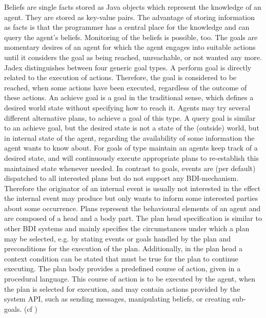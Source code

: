 Beliefs are single facts stored as Java objects which represent the knowledge of an agent. They are stored as key-value pairs. The advantage of storing information as facts is that the programmer has a central place for the knowledge and can query the agent's beliefs. Monitoring of the beliefs is possible, too. 
The goals are momentary desires of an agent for which the agent engages into suitable actions until it considers the goal as being reached, unreachable, or not wanted any more. Jadex distinguishes between four generic goal types. A perform goal is directly related to the execution of actions. Therefore, the goal is considered to be reached, when some actions have been executed, regardless of the outcome of these actions. An achieve goal is a goal in the traditional sense, which defines a desired world state without specifying how to reach it. Agents may try several different alternative plans, to achieve a goal of this type. A query goal is similar to an achieve goal, but the desired state is not a state of the (outside) world, but in internal state of the agent, regarding the availability of some information the agent wants to know about. For goals of type maintain an agents keep track of a desired state, and will continuously execute appropriate plans to re-establish this maintained state whenever needed. In contrast to goals, events are (per default) dispatched to all interested plans but do not support any BDI-mechanism. Therefore the originator of an internal event is usually not interested in the effect the internal event may produce but only wants to inform some interested parties about some occurrence. Plans represent the behavioural elements of an agent and are composed of a head and a body part. The plan head specification is similar to other BDI systems and mainly specifies the circumstances under which a plan may be selected, e.g. by stating events or goals handled by the plan and preconditions for the execution of the plan. Additionally, in the plan head a context condition can be stated that must be true for the plan to continue executing. The plan body provides a predefined course of action, given in a procedural language. This course of action is to be executed by the agent, when the plan is selected for execution, and may contain actions provided by the system API, such as sending messages, manipulating beliefs, or creating sub-goals. (cf \cite{Pokahr2})

